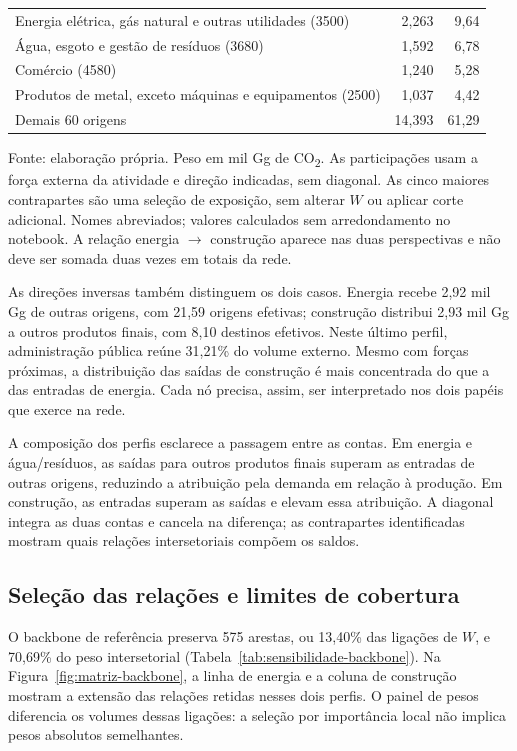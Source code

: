 \begin{table}[!ht]
\begin{tabular}{@{}>{\raggedright\arraybackslash}p{}rr@{}}
Energia elétrica, gás natural e outras utilidades (3500) & 2,263 & 9,64 \\
Água, esgoto e gestão de resíduos (3680) & 1,592 & 6,78 \\
Comércio (4580) & 1,240 & 5,28 \\
Produtos de metal, exceto máquinas e equipamentos (2500) & 1,037 & 4,42 \\
Demais 60 origens & 14,393 & 61,29 \\
\bottomrule
\end{tabular}
\par\smallskip\begin{minipage}{\textwidth}\footnotesize
Fonte: elaboração própria. Peso em mil Gg de CO\textsubscript{2}. As participações usam a força externa da atividade e direção indicadas, sem diagonal. As cinco maiores contrapartes são uma seleção de exposição, sem alterar $W$ ou aplicar corte adicional. Nomes abreviados; valores calculados sem arredondamento no notebook. A relação energia $\rightarrow$ construção aparece nas duas perspectivas e não deve ser somada duas vezes em totais da rede.
\end{minipage}
\end{table}

As direções inversas também distinguem os dois casos. Energia recebe 2,92 mil Gg de outras origens, com 21,59 origens efetivas; construção distribui 2,93 mil Gg a outros produtos finais, com 8,10 destinos efetivos. Neste último perfil, administração pública reúne 31,21\% do volume externo. Mesmo com forças próximas, a distribuição das saídas de construção é mais concentrada do que a das entradas de energia. Cada nó precisa, assim, ser interpretado nos dois papéis que exerce na rede.

A composição dos perfis esclarece a passagem entre as contas. Em energia e água/resíduos, as saídas para outros produtos finais superam as entradas de outras origens, reduzindo a atribuição pela demanda em relação à produção. Em construção, as entradas superam as saídas e elevam essa atribuição. A diagonal integra as duas contas e cancela na diferença; as contrapartes identificadas mostram quais relações intersetoriais compõem os saldos.

\clearpage
\subsection{Seleção das relações e limites de cobertura}

O backbone de referência preserva 575 arestas, ou 13,40\% das ligações de $W$, e 70,69\% do peso intersetorial (Tabela~\ref{tab:sensibilidade-backbone}). Na Figura~\ref{fig:matriz-backbone}, a linha de energia e a coluna de construção mostram a extensão das relações retidas nesses dois perfis. O painel de pesos diferencia os volumes dessas ligações: a seleção por importância local não implica pesos absolutos semelhantes.

